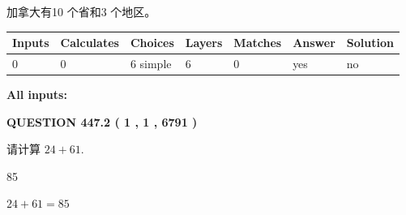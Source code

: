 \documentclass{ctexart}
\begin{document}
 
加拿大有10 个省和3 个地区。
 
 
\noindent{}
 
 
   
   
   
   
\noindent\begin{tabular}{|l|l|l|l|l|l|l|}
 \hline
Inputs & Calculates & Choices & Layers & Matches & Answer & Solution \\ \hline
 0  & 
 0  & 
 6
  simple  
  & 
 6  & 
 0  & 
  yes & 
  no 
  \\ \hline
 \end{tabular}
   
   
   
   
\noindent{}
   
   
   
   
\noindent\vspace{0.1in}\hspace{-0.08in} {\textbf{\Large{All inputs: }}}
   
   
  
\vspace{0.2in}
  
{\textbf{\Large{QUESTION
447.2 
 ( 1 , 1 , 6791 )
}}}
  
  
 
请计算 $ %
24 +  %
61 $.
 
 
 
\noindent{}
 
 

85
 
 
\noindent{}
 
 

 
 
 
\noindent{}
 
 

$ %
24 +  %
61=   %
85$
 
 
\noindent{}
 
 

 
   
   
   
\end{document}
